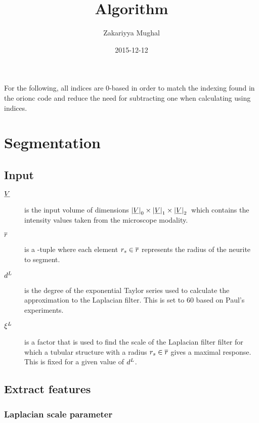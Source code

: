 \documentclass[12pt]{article}
\title{Algorithm}
\author{Zakariyya Mughal}
\date{2015-12-12}
\begin{document}
\maketitle
\tableofcontents

For the following, all indices are 0-based in order to match the
indexing found in the \gls{orionc} code and reduce the need for
subtracting one when calculating using indices.

\section{Segmentation}

\subsection{Input}

\newcommand{\foobar}[1]{\bm{#1}}

\begin{description}
	\item[\(\underline{V}{}\)] is the input volume of dimensions
		\(\left|\underline{V}\right|_0 \times \left|\underline{V}\right|_1 \times \left|\underline{V}\right|_2{}\) which contains the intensity values taken
		from the microscope modality.
	\item[\(\overline{r}{}\)] is a \Dim{\RadiiScalesName}-tuple where each element
		\(r_{s} \in \overline{r}\)
		represents the radius of the neurite to segment.
	\item[\(d^{L}{}\)] is the degree of the
		exponential Taylor series used to calculate the approximation
		to the Laplacian filter. This is set to \(\num{60}\) based on Paul's
		experiments.
	\item[\(\xi^{L}{}\)] is a factor that
		is used to find the scale of the Laplacian filter
		filter for which a tubular structure with a radius
		\(r_{s} \in \overline{r}\)
		gives a maximal response. This is fixed for a
		given value of \(d^{L}\).
\end{description}

\subsection{Extract features}

\subsubsection{Laplacian scale parameter}
\end{document}
